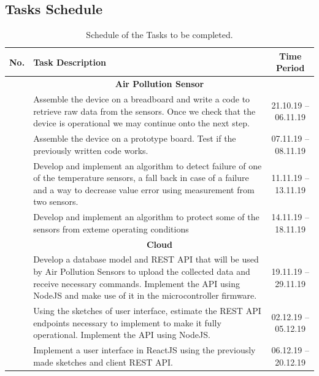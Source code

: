 \documentclass{article}
\newcounter{rowcounter}
\newcommand{\rownum}{\stepcounter{rowcounter}\arabic{rowcounter}}
\newcommand{\resetrownum}{\setcounter{rowcounter}{0}}
\begin{document}
		\subsection{Tasks Schedule}
			\resetrownum
			\begin{table}[h!]
				\begin{center}
					\caption{Schedule of the Tasks to be completed.}
					\label{tab:tasks-schedule}
					\begin{tabular}{l|p{5cm}|c}
						\textbf{No.} & \textbf{Task Description} & \textbf{Time Period} \\
						
						\hline
						\multicolumn{3}{c}{\textbf{Air Pollution Sensor}} \\
						\hline
						
						\rownum & Assemble the device on a breadboard and write a code to retrieve raw data from the sensors. Once we check that the device is operational we may continue onto the next step. & 21.10.19 -- 06.11.19 \\
						\rownum & Assemble the device on a prototype board. Test if the previously written code works. & 07.11.19 -- 08.11.19 \\
						\rownum & Develop and implement an algorithm to detect failure of one of the temperature sensors, a fall back in case of a failure and a way to decrease value error using measurement from two sensors. & 11.11.19 -- 13.11.19 \\
						\rownum & Develop and implement an algorithm to protect some of the sensors from exteme operating conditions & 14.11.19 -- 18.11.19 \\
						
						\hline
						\multicolumn{3}{c}{\textbf{Cloud}} \\
						\hline
						
						\rownum & Develop a database model and REST API that will be used by Air Pollution Sensors to upload the collected data and receive necessary commands. Implement the API using NodeJS and make use of it in the microcontroller firmware. & 19.11.19 -- 29.11.19 \\
						\rownum & Using the sketches of user interface, estimate the REST API endpoints necessary to implement to make it fully operational. Implement the API using NodeJS. &  02.12.19 -- 05.12.19 \\
						\rownum & Implement a user interface in ReactJS using the previously made sketches and client REST API. & 06.12.19 -- 20.12.19 \\
					\end{tabular}
				\end{center}
			\end{table}
			
\end{document}
